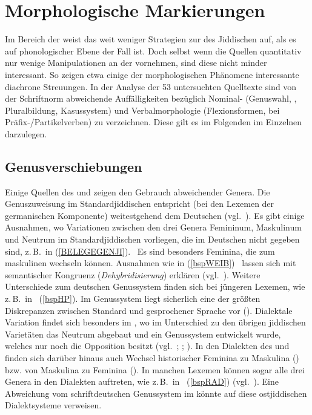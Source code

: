 \chapter{Morphologische Markierungen}\label{morphologie}
Im Bereich der  weist das \hai{{\LiJi}} weit weniger Strategien zur  des Jiddischen auf, als es auf phonologischer Ebene der Fall ist. Doch selbst wenn die Quellen quantitativ nur wenige Manipulationen an der  vornehmen, sind diese nicht minder interessant. So zeigen etwa einige der morphologischen Phänomene interessante diachrone Streuungen. In der Analyse der 53 untersuchten Quelltexte sind von der Schriftnorm abweichende Auffälligkeiten bezüglich Nominal- (Genuswahl, , Pluralbildung, Kasussystem) und Verbalmorphologie (Flexionsformen,  bei Präfix-/Partikelverben) zu verzeichnen. Diese gilt es im Folgenden im Einzelnen darzulegen.

 \section{Genusverschiebungen}\label{genus}
 Einige Quellen des  und  zeigen den Gebrauch abweichender Genera. Die Genuszuweisung im Standardjiddischen entspricht (bei den Lexemen der germanischen Komponente) weitestgehend dem Deutschen (vgl.\, \citealt[166–168]{Jacobs2005}). Es gibt einige Ausnahmen, wo Variationen zwischen den drei Genera Femininum, Maskulinum und Neutrum im Standardjiddischen vorliegen, die im Deutschen nicht gegeben sind, z.\,B.\, in (\ref{BELEGEGENJI}). \,%
  Es sind besonders Feminina, die zum maskulinen  wechseln können. Ausnahmen wie in (\ref{bspWEIB}) \,%
  lassen sich mit semantischer Kongruenz (\textit{Dehybridisierung}) erklären (vgl.\, \citealt{Fleischer2012}). Weitere Unterschiede zum deutschen Genussystem finden sich bei jüngeren Lexemen, wie z.\,B.\, in \,%
  (\ref{bspHP}). Im Genussystem liegt sicherlich eine der größten Diskrepanzen zwischen Standard und gesprochener Sprache vor (\citealt[insbes. 153–207]{Wolf1969}). \label{GENUSNOJ}Dialektale Variation findet sich besonders im \hai{{\NOJ}}, wo im Unterschied zu den übrigen jiddischen Varietäten das Neutrum abgebaut und ein Genussystem entwickelt wurde, welches nur noch die Opposition  besitzt (vgl.\, \citealt{Jacobs1990b}; \citealt{Wolf1969}; \citealt[101–124]{Herzog1965}). In den Dialekten des \hai{{\NOJ}} und \hai{{\SOJ}} finden sich darüber hinaus auch Wechsel historischer Feminina zu Maskulina (\citealt[160–168]{Wolf1969}) bzw. von Maskulina zu Feminina (\citealt[168–176]{Wolf1969}). In manchen Lexemen können sogar alle drei Genera in den Dialekten auftreten, wie z.\,B.\, in \,%
  (\ref{bspRAD})  (vgl.\, \citealt[178]{Wolf1969}). Eine Abweichung vom schriftdeutschen Genussystem im \hai{{\LiJi}} könnte auf diese ostjiddischen Dialektsysteme verweisen.
 
